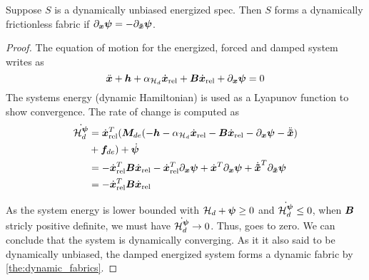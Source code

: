 \begin{lemma}
  Suppose $S$ is a dynamically unbiased energized spec. Then $S$
  forms a dynamically frictionless
  fabric if  $\partial_{\bm{x}}\bm{\psi} = -\partial_{\bm{\tilde{x}}}\bm{\psi}$.%
\label{lem:dynamically_energized_fabrics}
\end{lemma}
\begin{proof}
  The equation of motion for the energized, forced and damped system writes as 
  \begin{equation}
    \ddot{\bm{x}} + \bm{h} + \alpha_{\mathcal{H}_d}\dot{\bm{x}}_{\textrm{rel}} + \bm{B}\dot{\bm{x}}_{\textrm{rel}} + \partial_{\bm{x}}\bm{\psi} = 0
  \end{equation}
  The systems energy (dynamic Hamiltonian) is used as a Lyapunov function to show
  convergence. The rate of change is computed as
  \begin{align*}
    \dot{\mathcal{H}_d^{\bm{\psi}}} &= \dot{\bm{x}}_{\textrm{rel}}^T(
      \bm{M}_{de}(
        -\bm{h}
        - \alpha_{\mathcal{H}_d}\dot{\bm{x}}_{\textrm{rel}} 
        - \bm{B}\dot{\bm{x}}_{\textrm{rel}} 
        - \partial_{\bm{x}}\bm{\psi}
        - \ddot{\bm{\tilde{x}}}) \\
      & + \bm{f}_{de}) 
      + \dot{\bm{\psi}} \\
              &= -\dot{\bm{x}}_{\textrm{rel}}^T\bm{B}\dot{\bm{x}}_{\textrm{rel}}
      - \dot{\bm{x}}_{\textrm{rel}}^T\partial_{\bm{x}}\bm{\psi}
      + \dot{\bm{x}}^T\partial_{\bm{x}}\bm{\psi}
      + \dot{\bm{\tilde{x}}}^T\partial_{\bm{\tilde{x}}}\bm{\psi} \\
              &= -\dot{\bm{x}}_{\textrm{rel}}^T\bm{B}\dot{\bm{x}}_{\textrm{rel}} \\
  \end{align*}

  As the system energy is lower bounded with $\mathcal{H}_d + \bm{\psi} \geq 0$ and 
  $\dot{\mathcal{H}_d^{\bm{\psi}}} \leq 0$, when $\bm{B}$ stricly positive definite, we must have
$\dot{\mathcal{H}_d^{\bm{\psi}}} \to 0$. Thus, \xrdot{} goes to zero. We can conclude that the system is
dynamically converging. As it it also said to be dynamically unbiased, the damped
energized system forms a dynamic fabric by \cref{the:dynamic_fabrics}.
\end{proof}

